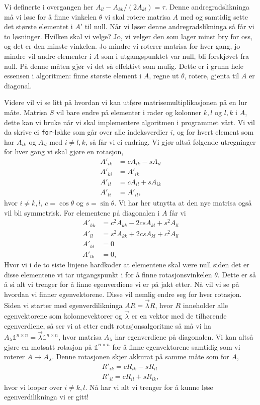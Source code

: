 \documentclass[norsk, 12pt]{article}
\theoremstyle{definition} \newtheorem{defi}{Definisjon}[subsection]
\theoremstyle{definition} \newtheorem{teo}{Teorem}[subsection]
\theoremstyle{definition} \newtheorem*{eks}{Eksempel}
\begin{document}
Vi definerte i overgangen her $A_{ll} - A_{kk}/(2A_{kl}) = \tau$. Denne andregradslikninga må vi løse for å finne vinkelen $\theta$ vi skal rotere matrisa $A$ med og samtidig sette det største elementet i $A'$ til null. Når vi løser denne andregradslikninga så får vi to løsninger. Hvilken skal vi velge? Jo, vi velger den som lager minst bry for oss, og det er den minste vinkelen. Jo mindre vi roterer matrisa for hver gang, jo mindre vil andre elementer i $A$ som i utgangspunktet var null, bli forskjøvet fra null. På denne måten gjør vi det så effektivt som mulig. Dette er i grunn hele essensen i algoritmen: finne største element i $A$, regne ut $\theta$, rotere, gjenta til $A$ er diagonal.

Videre vil vi se litt på hvordan vi kan utføre matrisemultiplikasjonen på en lur måte. Matrisa $S$ vil bare endre på elementer i rader og kolonner $k,l$ og $l,k$ i $A$, dette kan vi bruke når vi skal implementere algoritmen i programmet vårt. Vi vil da skrive ei \verb|for|-løkke som går over alle indeksverdier $i$, og for hvert element som har $ A_{ik}$ og $A_{il}$ med $ i \neq l,k$, så får vi ei endring. Vi gjør altså følgende utregninger for hver gang vi skal gjøre en rotasjon,
\begin{align*}
	A'_{ik} &= cA_{ik} - sA_{il}\\
	A'_{ki} &= A'_{ik}\\
    A'_{il} &= cA_{il} + sA_{ik}\\
    A'_{li} &= A'_{il},
\end{align*}
hvor $i\neq k,l$, $c = \cos\theta$ og $s=\sin\theta$. Vi har her utnytta at den nye matrisa også vil bli symmetrisk. For elementene på diagonalen i $A$ får vi
\begin{align*}
	A'_{kk} &= c^2A_{kk} - 2csA_{kl} + s^2A_{ll}\\
	A'_{ll} &= s^2A_{kk} + 2csA_{kl} + c^2A_{ll}\\
	A'_{kl} &= 0\\
	A'_{lk} &= 0,
\end{align*}
Hvor vi i de to siste linjene hardkoder at elementene skal være null siden det er disse elementene vi tar utgangspunkt i for å finne rotasjonsvinkelen $\theta$. Dette er så å si alt vi trenger for å finne egenverdiene vi er på jakt etter. Nå vil vi se på hvordan vi finner egenvektorene. Disse vil nemlig endre seg for hver rotasjon. Siden vi starter med egenverdilikninga $AR = \vec\lambda R$, hvor $R$ inneholder alle egenvektorene som kolonnevektorer og $\vec \lambda$ er en vektor med de tilhørende egenverdiene, så ser vi at etter endt rotasjonsalgoritme så må vi ha $A_\lambda \mathbb{1}^{n\times n} = \vec\lambda \mathbb{1}^{n\times n}$, hvor matrisa $A_\lambda$ har egenverdiene på diagonalen. Vi kan altså gjøre en motsatt rotasjon på $\mathbb{1}^{n\times n}$ for å finne egenvektorene samtidig som vi roterer $A \to A_\lambda$. Denne rotasjonen skjer akkurat på samme måte som for $A$,
\begin{align*}
	R'_{ik} = cR_{ik} - sR_{il}\\
	R'_{il} = cR_{il} + sR_{ik},
\end{align*}
hvor vi looper over $i \neq k,l$. Nå har vi alt vi trenger for å kunne løse egenverdilikninga vi er gitt!
\end{document}
